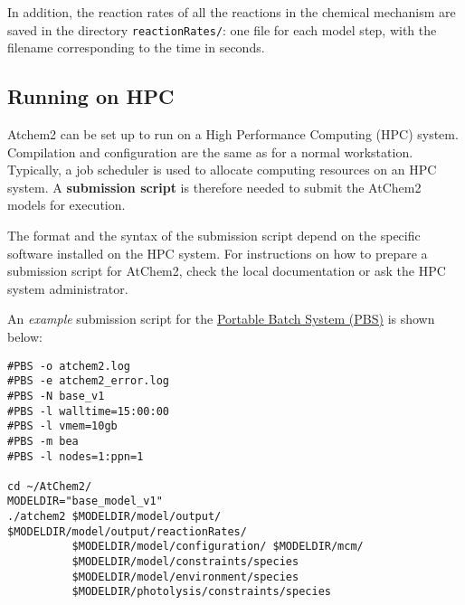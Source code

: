 In addition, the reaction rates of all the reactions in the chemical
mechanism are saved in the directory \texttt{reactionRates/}: one file
for each model step, with the filename corresponding to the time in
seconds.

\subsection{Running on HPC} \label{subsec:running-on-hpc}

Atchem2 can be set up to run on a High Performance Computing (HPC)
system. Compilation and configuration are the same as for a normal
workstation. Typically, a job scheduler is used to allocate computing
resources on an HPC system. A \textbf{submission script} is therefore
needed to submit the AtChem2 models for execution.

The format and the syntax of the submission script depend on the
specific software installed on the HPC system. For instructions on how
to prepare a submission script for AtChem2, check the local
documentation or ask the HPC system administrator.

An \emph{example} submission script for the
\href{https://en.wikipedia.org/wiki/Portable_Batch_System}{Portable
  Batch System (PBS)} is shown below:

\begin{verbatim}
#PBS -o atchem2.log
#PBS -e atchem2_error.log
#PBS -N base_v1
#PBS -l walltime=15:00:00
#PBS -l vmem=10gb
#PBS -m bea
#PBS -l nodes=1:ppn=1

cd ~/AtChem2/
MODELDIR="base_model_v1"
./atchem2 $MODELDIR/model/output/ $MODELDIR/model/output/reactionRates/
          $MODELDIR/model/configuration/ $MODELDIR/mcm/
          $MODELDIR/model/constraints/species
          $MODELDIR/model/environment/species
          $MODELDIR/photolysis/constraints/species
\end{verbatim}
